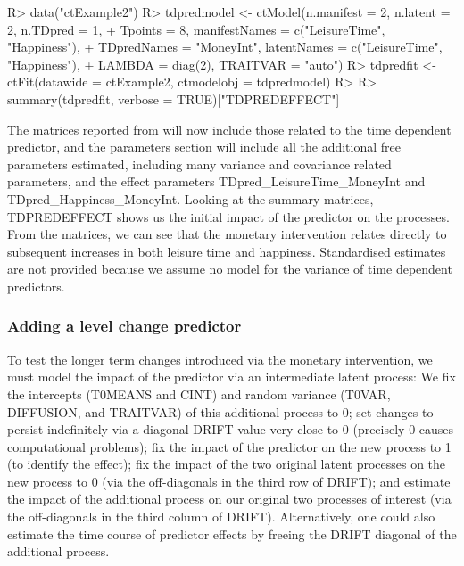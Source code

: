 \documentclass[nojss]{jss}\usepackage[]{graphicx}\usepackage[]{color}
\begin{document}
\begin{Schunk}
\begin{Sinput}
R> data("ctExample2")
R> tdpredmodel <- ctModel(n.manifest = 2, n.latent = 2, n.TDpred = 1, 
+   Tpoints = 8, manifestNames = c("LeisureTime", "Happiness"), 
+   TDpredNames = "MoneyInt", latentNames = c("LeisureTime", "Happiness"),
+   LAMBDA = diag(2), TRAITVAR = "auto")
R> tdpredfit <- ctFit(datawide = ctExample2, ctmodelobj = tdpredmodel)
R> 
R> summary(tdpredfit, verbose = TRUE)["TDPREDEFFECT"]
\end{Sinput}
\end{Schunk}


The matrices reported from  will now include those related to the time dependent predictor, and the parameters section will include all the additional free parameters estimated, including many variance and covariance related parameters, and the effect parameters TDpred\_LeisureTime\_MoneyInt and TDpred\_Happiness\_MoneyInt.  Looking at the summary matrices, TDPREDEFFECT shows us the initial impact of the predictor on the processes.  From the matrices, we can see that the monetary intervention relates directly to subsequent increases in both leisure time and happiness. Standardised estimates are not provided because we assume no model for the variance of time dependent predictors.

\subsubsection{Adding a level change predictor}\nopagebreak
To test the longer term changes introduced via the monetary intervention, we must model the impact of the predictor via an intermediate latent process: We fix the intercepts (T0MEANS and CINT) and random variance (T0VAR, DIFFUSION, and TRAITVAR) of this additional process to 0; set changes to persist indefinitely via a diagonal DRIFT value very close to 0 (precisely 0 causes computational problems); fix the impact of the predictor on the new process to 1 (to identify the effect); fix the impact of the two original latent processes on the new process to 0 (via the off-diagonals in the third row of DRIFT); and estimate the impact of the additional process on our original two processes of interest (via the off-diagonals in the third column of DRIFT). Alternatively, one could also estimate the time course of predictor effects by freeing the DRIFT diagonal of the additional process. 
\end{document}
